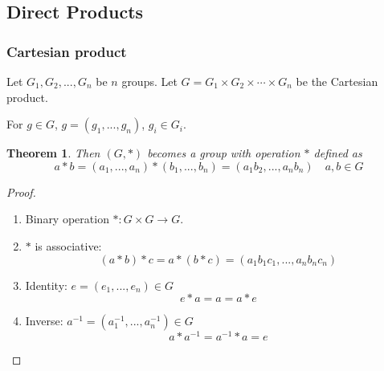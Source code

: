 \documentclass[11pt,a4paper]{article}
\newtheorem{theorem}{Theorem}
\begin{document}
\subsection{Direct Products}
\subsubsection{Cartesian product}
Let $G_1,G_2,...,G_n$ be $n$ groups. Let $G=G_1\times G_2\times\cdots\times G_n$ be the Cartesian product.

For $g\in G$, $g=(g_1,...,g_n)$, $g_i\in G_i$.

\begin{theorem}
Then $(G,*)$ becomes a group with operation $*$ defined as
$$a*b=(a_1,...,a_n)*(b_1,...,b_n)=(a_1b_2,...,a_nb_n)\quad a,b\in G$$
\end{theorem}
\begin{proof}
    \quad

\begin{enumerate}[(1)]
    \item Binary operation $*:G\times G \rightarrow	G$.
    \item $*$ is associative: $$(a*b)*c=a*(b*c)=(a_1b_1c_1,...,a_nb_nc_n)$$
    \item Identity: $e=(e_1,...,e_n)\in G$ $$e*a=a=a*e$$
    \item Inverse: $a^{-1}=(a_1^{-1},...,a_n^{-1})\in G$ $$a*a^{-1}=a^{-1}*a=e$$
\end{enumerate}
\end{proof}
\end{document}
